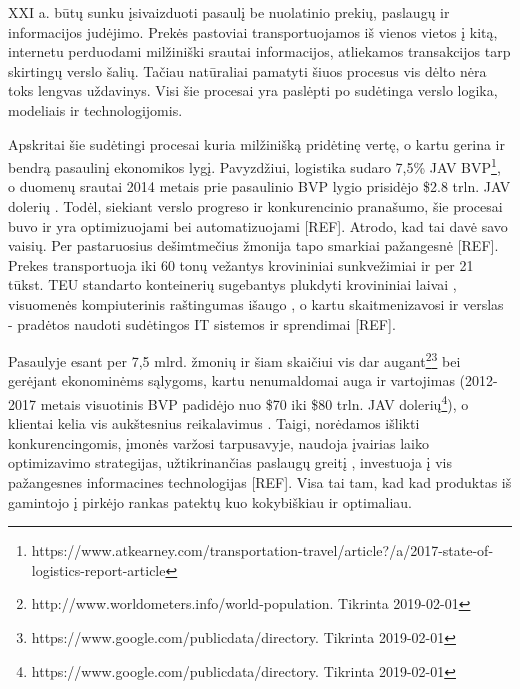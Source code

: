 
XXI a. būtų sunku įsivaizduoti pasaulį be nuolatinio prekių, paslaugų ir informacijos judėjimo. Prekės pastoviai transportuojamos iš vienos vietos į kitą, internetu perduodami milžiniški srautai informacijos, atliekamos transakcijos tarp skirtingų verslo šalių. Tačiau natūraliai pamatyti šiuos procesus vis dėlto nėra toks lengvas uždavinys. Visi šie procesai yra paslėpti po sudėtinga verslo logika, modeliais ir technologijomis. 

Apskritai šie sudėtingi procesai kuria milžinišką pridėtinę vertę, o kartu gerina ir bendrą pasaulinį ekonomikos lygį. Pavyzdžiui, logistika sudaro 7,5\% JAV BVP\footnote{https://www.atkearney.com/transportation-travel/article?/a/2017-state-of-logistics-report-article}, o duomenų srautai 2014 metais prie pasaulinio BVP lygio prisidėjo \$2.8 trln. JAV dolerių \cite{manyika2016digital}. Todėl, siekiant verslo progreso ir konkurencinio pranašumo, šie procesai buvo ir yra optimizuojami bei automatizuojami [REF]. Atrodo, kad tai davė savo vaisių. Per pastaruosius dešimtmečius žmonija tapo smarkiai pažangesnė [REF]. Prekes transportuoja iki 60 tonų vežantys krovininiai sunkvežimiai \cite{lumsden2004truck} ir per 21 tūkst. TEU standarto konteinerių sugebantys plukdyti krovininiai laivai \cite{halff2019likely}, visuomenės kompiuterinis raštingumas išaugo \cite{van2015internet}, o kartu skaitmenizavosi ir verslas - pradėtos naudoti sudėtingos IT sistemos ir sprendimai [REF].

Pasaulyje esant per 7,5 mlrd. žmonių ir šiam skaičiui vis dar augant\footnote{http://www.worldometers.info/world-population. Tikrinta 2019-02-01}\footnote{https://www.google.com/publicdata/directory. Tikrinta 2019-02-01} bei gerėjant ekonominėms sąlygoms, kartu nenumaldomai auga ir vartojimas (2012-2017 metais visuotinis BVP padidėjo nuo \$70 iki \$80 trln. JAV dolerių\footnote{https://www.google.com/publicdata/directory. Tikrinta 2019-02-01}), o klientai kelia vis aukštesnius reikalavimus \cite{nilsson2006logistics}. Taigi, norėdamos išlikti konkurencingomis, įmonės varžosi tarpusavyje, naudoja įvairias laiko optimizavimo strategijas, užtikrinančias paslaugų greitį \cite{zacharia2004logistics}, investuoja į vis pažangesnes informacines technologijas [REF]. Visa tai tam, kad kad produktas iš gamintojo į pirkėjo rankas patektų kuo kokybiškiau ir optimaliau.

